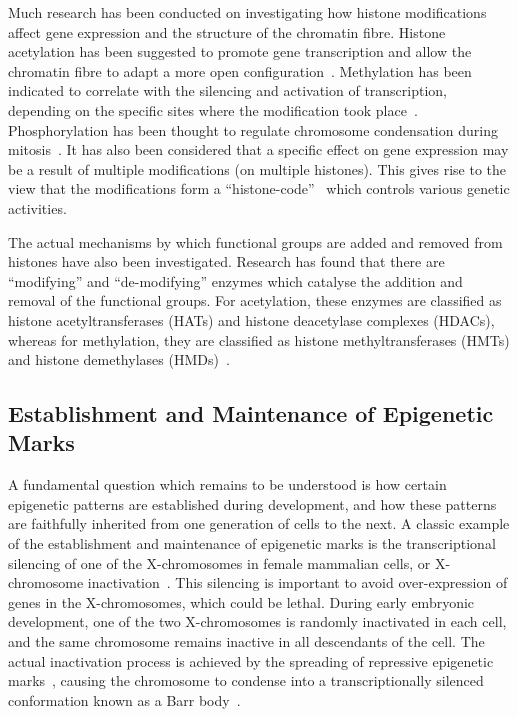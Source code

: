 \documentclass[12pt]{article}
\begin{document}
Much research has been conducted on investigating how histone modifications affect gene expression and the structure of the chromatin fibre. Histone acetylation has been suggested to promote gene transcription and allow the chromatin fibre to adapt a more open configuration~\cite{shahbazian2007}. Methylation has been indicated to correlate with the silencing and activation of transcription, depending on the specific sites where the modification took place~\cite{greer2012}. Phosphorylation has been thought to regulate chromosome condensation during mitosis~\cite{sawicka2014}. It has also been considered that a specific effect on gene expression may be a result of multiple modifications (on multiple histones). This gives rise to the view that the modifications form a ``histone-code''~\cite{strahl2000} which controls various genetic activities.

The actual mechanisms by which functional groups are added and removed from histones have also been investigated. Research has found that there are ``modifying'' and ``de-modifying'' enzymes which catalyse the addition and removal of the functional groups. For acetylation, these enzymes are classified as histone acetyltransferases (HATs) and histone deacetylase complexes (HDACs), whereas for methylation, they are classified as histone methyltransferases (HMTs) and histone demethylases (HMDs)~\cite{shahbazian2007, greer2012}.

\subsection{Establishment and Maintenance of Epigenetic Marks}
A fundamental question which remains to be understood is how certain epigenetic patterns are established during development, and how these patterns are faithfully inherited from one generation of cells to the next. A classic example of the establishment and maintenance of epigenetic marks is the transcriptional silencing of one of the X-chromosomes in female mammalian cells, or X-chromosome inactivation~\cite{avner2001}. This silencing is important to avoid over-expression of genes in the X-chromosomes, which could be lethal. During early embryonic development, one of the two X-chromosomes is randomly inactivated in each cell, and the same chromosome remains inactive in all descendants of the cell. The actual inactivation process is achieved by the spreading of repressive epigenetic marks~\cite{heard2001, nicodemi2007}, causing the chromosome to condense into a transcriptionally silenced conformation known as a Barr body~\cite{avner2001}. 
\end{document}
